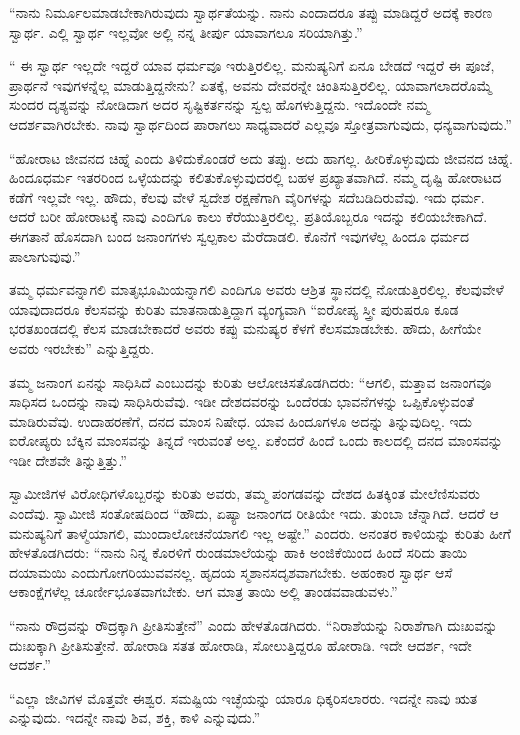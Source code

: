  “ನಾನು ನಿರ್ಮೂಲಮಾಡಬೇಕಾಗಿರುವುದು ಸ್ವಾರ್ಥತೆಯನ್ನು. ನಾನು ಎಂದಾದರೂ ತಪ್ಪು ಮಾಡಿದ್ದರೆ ಅದಕ್ಕೆ ಕಾರಣ ಸ್ವಾರ್ಥ. ಎಲ್ಲಿ ಸ್ವಾರ್ಥ ಇಲ್ಲವೋ‌ ಅಲ್ಲಿ ನನ್ನ ತೀರ್ಪು ಯಾವಾಗಲೂ ಸರಿಯಾಗಿತ್ತು.” 

 “ ಈ ಸ್ವಾರ್ಥ ಇಲ್ಲದೇ ಇದ್ದರೆ ಯಾವ ಧರ್ಮವೂ ಇರುತ್ತಿರಲಿಲ್ಲ. ಮನುಷ್ಯನಿಗೆ ಏನೂ ಬೇಡದೆ ಇದ್ದರೆ ಈ ಪೂಜೆ, ಪ್ರಾರ್ಥನೆ ಇವುಗಳನ್ನೆಲ್ಲ ಮಾಡುತ್ತಿದ್ದನೇನು? ಏತಕ್ಕೆ, ಅವನು ದೇವರನ್ನೇ ಚಿಂತಿಸುತ್ತಿರಲಿಲ್ಲ. ಯಾವಾಗಲಾದರೊಮ್ಮೆ ಸುಂದರ ದೃಶ್ಯವನ್ನು ನೋಡಿದಾಗ ಅದರ ಸೃಷ್ಟಿಕರ್ತನನ್ನು ಸ್ವಲ್ಪ ಹೊಗಳುತ್ತಿದ್ದನು. ಇದೊಂದೇ ನಮ್ಮ ಆದರ್ಶವಾಗಿರಬೇಕು. ನಾವು ಸ್ವಾರ್ಥದಿಂದ ಪಾರಾಗಲು ಸಾಧ್ಯವಾದರೆ ಎಲ್ಲವೂ ಸ್ತೋತ್ರವಾಗುವುದು, ಧನ್ಯವಾಗುವುದು.” 

 “ಹೋರಾಟ ಜೀವನದ ಚಿಹ್ನೆ ಎಂದು ತಿಳಿದುಕೊಂಡರೆ ಅದು ತಪ್ಪು. ಅದು ಹಾಗಲ್ಲ. ಹೀರಿಕೊಳ್ಳುವುದು ಜೀವನದ ಚಿಹ್ನೆ. ಹಿಂದೂಧರ್ಮ ಇತರರಿಂದ ಒಳ್ಳೆಯದನ್ನು ಕಲಿತುಕೊಳ್ಳುವುದರಲ್ಲಿ ಬಹಳ ಪ್ರಖ್ಯಾತವಾಗಿದೆ. ನಮ್ಮ ದೃಷ್ಟಿ ಹೋರಾಟದ ಕಡೆಗೆ ಇಲ್ಲವೇ ಇಲ್ಲ. ಹೌದು, ಕೆಲವು ವೇಳೆ ಸ್ವದೇಶ ರಕ್ಷಣೆಗಾಗಿ ವೈರಿಗಳನ್ನು ಸದೆಬಡಿದಿರುವೆವು. ಇದು ಧರ್ಮ. ಆದರೆ ಬರೀ ಹೋರಾಟಕ್ಕೆ ನಾವು ಎಂದಿಗೂ ಕಾಲು ಕೆರೆಯುತ್ತಿರಲಿಲ್ಲ. ಪ್ರತಿಯೊಬ್ಬರೂ ಇದನ್ನು ಕಲಿಯಬೇಕಾಗಿದೆ. ಈಗತಾನೆ ಹೊಸದಾಗಿ ಬಂದ ಜನಾಂಗಗಳು ಸ್ವಲ್ಪಕಾಲ ಮೆರೆದಾಡಲಿ. ಕೊನೆಗೆ ಇವುಗಳೆಲ್ಲ ಹಿಂದೂ ಧರ್ಮದ ಪಾಲಾಗುವುವು.” 

 ತಮ್ಮ ಧರ್ಮವನ್ನಾಗಲಿ ಮಾತೃಭೂಮಿಯನ್ನಾಗಲಿ ಎಂದಿಗೂ ಅವರು ಆಶ್ರಿತ ಸ್ಥಾನದಲ್ಲಿ ನೋಡುತ್ತಿರಲಿಲ್ಲ. ಕೆಲವುವೇಳೆ ಯಾವುದಾದರೂ ಕೆಲಸವನ್ನು ಕುರಿತು ಮಾತನಾಡುತ್ತಿದ್ದಾಗ ವ್ಯಂಗ್ಯವಾಗಿ “ಐರೋಪ್ಯ ಸ್ತ್ರೀ ಪುರುಷರೂ ಕೂಡ ಭರತಖಂಡದಲ್ಲಿ ಕೆಲಸ ಮಾಡಬೇಕಾದರೆ ಅವರು ಕಪ್ಪು ಮನುಷ್ಯರ ಕೆಳಗೆ ಕೆಲಸಮಾಡಬೇಕು. ಹೌದು, ಹೀಗೆಯೇ ಅವರು ಇರಬೇಕು” ಎನ್ನುತ್ತಿದ್ದರು. 

 ತಮ್ಮ ಜನಾಂಗ ಏನನ್ನು ಸಾಧಿಸಿದೆ ಎಂಬುದನ್ನು ಕುರಿತು ಆಲೋಚಿಸತೊಡಗಿದರು: “ಆಗಲಿ, ಮತ್ತಾವ ಜನಾಂಗವೂ ಸಾಧಿಸದ ಒಂದನ್ನು ನಾವು ಸಾಧಿಸಿರುವೆವು. ಇಡೀ ದೇಶದವರನ್ನು ಒಂದೆರಡು ಭಾವನೆಗಳನ್ನು ಒಪ್ಪಿಕೊಳ್ಳುವಂತೆ ಮಾಡಿರುವೆವು. ಉದಾಹರಣೆಗೆ, ದನದ ಮಾಂಸ ನಿಷೇಧ. ಯಾವ ಹಿಂದೂಗಳೂ ಅದನ್ನು ತಿನ್ನುವುದಿಲ್ಲ. ಇದು ಐರೋಪ್ಯರು ಬೆಕ್ಕಿನ ಮಾಂಸವನ್ನು ತಿನ್ನದೆ ಇರುವಂತೆ ಅಲ್ಲ. ಏಕೆಂದರೆ ಹಿಂದೆ ಒಂದು ಕಾಲದಲ್ಲಿ ದನದ ಮಾಂಸವನ್ನು ಇಡೀ ದೇಶವೇ ತಿನ್ನುತ್ತಿತ್ತು.” 

 ಸ್ವಾಮೀಜಿಗಳ ವಿರೋಧಿಗಳೊಬ್ಬರನ್ನು ಕುರಿತು ಅವರು, ತಮ್ಮ ಪಂಗಡವನ್ನು ದೇಶದ ಹಿತಕ್ಕಿಂತ ಮೇಲೆಣಿಸುವರು ಎಂದೆವು. ಸ್ವಾಮೀಜಿ ಸಂತೋಷದಿಂದ “ಹೌದು, ಏಷ್ಯಾ ಜನಾಂಗದ ರೀತಿಯೇ ಇದು. ತುಂಬಾ ಚೆನ್ನಾಗಿದೆ. ಆದರೆ ಆ ಮನುಷ್ಯನಿಗೆ ತಾಳ್ಮೆಯಾಗಲಿ, ಮುಂದಾಲೋಚನೆಯಾಗಲಿ ಇಲ್ಲ ಅಷ್ಟೇ.” ಎಂದರು. ಅನಂತರ ಕಾಳಿಯನ್ನು ಕುರಿತು ಹೀಗೆ ಹೇಳತೊಡಗಿದರು: “ನಾನು ನಿನ್ನ ಕೊರಳಿಗೆ ರುಂಡಮಾಲೆಯನ್ನು ಹಾಕಿ ಅಂಜಿಕೆಯಿಂದ ಹಿಂದೆ ಸರಿದು ತಾಯಿ ದಯಾಮಯಿ ಎಂದು\break ಗೋಗರಿಯುವವನಲ್ಲ. ಹೃದಯ ಸ್ಮಶಾನಸದೃಶವಾಗಬೇಕು. ಅಹಂಕಾರ ಸ್ವಾರ್ಥ ಆಸೆ ಆಕಾಂಕ್ಷೆಗಳೆಲ್ಲ ಚೂರ್ಣೀಭೂತವಾಗಬೇಕು. ಆಗ ಮಾತ್ರ ತಾಯಿ ಅಲ್ಲಿ ತಾಂಡವವಾಡುವಳು.” 

 “ನಾನು ರೌದ್ರವನ್ನು ರೌದ್ರಕ್ಕಾಗಿ ಪ್ರೀತಿಸುತ್ತೇನೆ” ಎಂದು ಹೇಳತೊಡಗಿದರು. “ನಿರಾಶೆಯನ್ನು ನಿರಾಶೆಗಾಗಿ ದುಃಖವನ್ನು ದುಃಖಕ್ಕಾಗಿ ಪ್ರೀತಿಸುತ್ತೇನೆ. ಹೋರಾಡಿ ಸತತ ಹೋರಾಡಿ, ಸೋಲುತ್ತಿದ್ದರೂ ಹೋರಾಡಿ. ಇದೇ ಆದರ್ಶ, ಇದೇ ಆದರ್ಶ.” 

 “ಎಲ್ಲಾ ಜೀವಿಗಳ ಮೊತ್ತವೇ ಈಶ್ವರ. ಸಮಷ್ಟಿಯ ಇಚ್ಛೆಯನ್ನು ಯಾರೂ ಧಿಕ್ಕರಿಸಲಾರರು. ಇದನ್ನೇ ನಾವು ಋತ ಎನ್ನುವುದು. ಇದನ್ನೇ ನಾವು ಶಿವ, ಶಕ್ತಿ, ಕಾಳಿ ಎನ್ನುವುದು.” 

